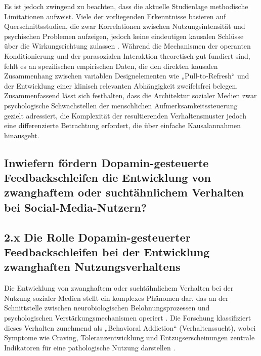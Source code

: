 \documentclass[11pt,a4paper]{article}
\begin{document}
Es ist jedoch zwingend zu beachten, dass die aktuelle Studienlage methodische Limitationen aufweist. Viele der vorliegenden Erkenntnisse basieren auf Querschnittsstudien, die zwar Korrelationen zwischen Nutzungsintensität und psychischen Problemen aufzeigen, jedoch keine eindeutigen kausalen Schlüsse über die Wirkungsrichtung zulassen \autocite{doaj_10febcbb5e60420699a1d4570a075832,openalex_W2924664363,crossref_10_3389_fpsyg_2026_1840700}. Während die Mechanismen der operanten Konditionierung und der parasozialen Interaktion theoretisch gut fundiert sind, fehlt es an spezifischen empirischen Daten, die den direkten kausalen Zusammenhang zwischen variablen Designelementen wie „Pull-to-Refresh“ und der Entwicklung einer klinisch relevanten Abhängigkeit zweifelsfrei belegen. Zusammenfassend lässt sich festhalten, dass die Architektur sozialer Medien zwar psychologische Schwachstellen der menschlichen Aufmerksamkeitssteuerung gezielt adressiert, die Komplexität der resultierenden Verhaltensmuster jedoch eine differenzierte Betrachtung erfordert, die über einfache Kausalannahmen hinausgeht.

\subsection{Inwiefern fördern Dopamin-gesteuerte Feedbackschleifen die Entwicklung von zwanghaftem oder suchtähnlichem Verhalten bei Social-Media-Nutzern?}

\subsection{2.x Die Rolle Dopamin-gesteuerter Feedbackschleifen bei der Entwicklung zwanghaften Nutzungsverhaltens}

Die Entwicklung von zwanghaftem oder suchtähnlichem Verhalten bei der Nutzung sozialer Medien stellt ein komplexes Phänomen dar, das an der Schnittstelle zwischen neurobiologischen Belohnungsprozessen und psychologischen Verstärkungsmechanismen operiert \autocite{crossref_10_51473_rcmos_v1i2_2025_1736}. Die Forschung klassifiziert dieses Verhalten zunehmend als „Behavioral Addiction“ (Verhaltenssucht), wobei Symptome wie Craving, Toleranzentwicklung und Entzugserscheinungen zentrale Indikatoren für eine pathologische Nutzung darstellen \autocite{crossref_10_51473_rcmos_v1i2_2025_1736,crossref_10_55032_atskj_psychol_2020_1103}.
\end{document}
